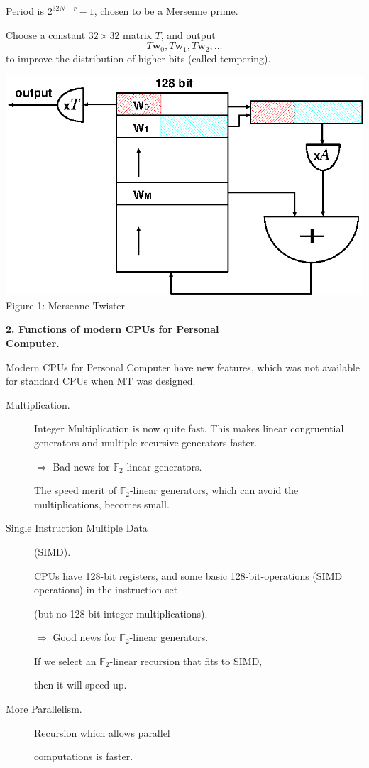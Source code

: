 \documentclass[a4j,12pt,landscape]{jarticle}
\def\F2{{\mathbb F}_2}
\def\bw{{{\mathbf w}}}
\begin{document}
Period is $2^{32N-r}-1$, chosen to be a Mersenne prime.

\vskip 5mm

Choose a constant $32\times 32$ matrix $T$, 
and output
$$
T \bw_0, T \bw_1, T \bw_2, \ldots
$$
to improve the distribution of higher bits (called tempering).
\newpage
\begin{center}
\includegraphics[width=0.9\linewidth]{mt-a.eps}
\\
Figure 1: Mersenne Twister
\end{center}
\newpage
\noindent
{\bf 2. Functions of modern CPUs for Personal \\Computer.}

Modern CPUs for Personal Computer have new features, 
which was not available for standard CPUs 
when MT was designed.
\begin{description}
\item[Multiplication.]
Integer Multiplication is now quite fast.
This makes linear congruential generators 
and multiple recursive generators faster.

$\Rightarrow$ 
Bad news for $\F2$-linear generators.

The speed merit of $\F2$-linear generators,
which can avoid the multiplications,
becomes small.

\newpage
\item[Single Instruction Multiple Data] (SIMD).

CPUs have 128-bit registers, and
some basic 128-bit-operations (SIMD operations) in the 
instruction set

(but no 128-bit integer multiplications).

$\Rightarrow$ 
Good news for $\F2$-linear generators.

If we select an $\F2$-linear
recursion that fits to SIMD, 

then it will speed up.

\item[More Parallelism.]

Recursion which allows parallel

 computations is faster.
\end{description}
\end{document}
